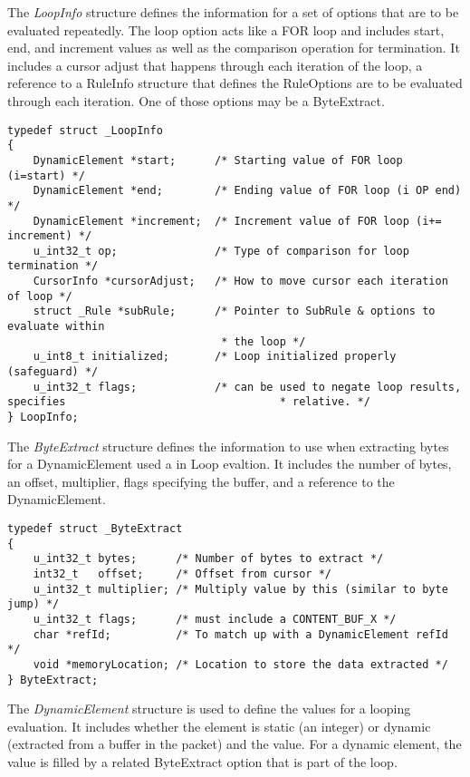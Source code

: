 \documentclass[english]{report}
\begin{document}
\begin{itemize}
The {\em LoopInfo} structure defines the information for a
set of options that are to be evaluated repeatedly.  The loop option
acts like a FOR loop and includes start, end, and increment values
as well as the comparison operation for termination.  It includes
a cursor adjust that happens through each iteration of the
loop, a reference to a RuleInfo structure that defines the
RuleOptions are to be evaluated through each iteration.  One of those
options may be a ByteExtract.

\begin{verbatim}
typedef struct _LoopInfo
{
    DynamicElement *start;      /* Starting value of FOR loop (i=start) */
    DynamicElement *end;        /* Ending value of FOR loop (i OP end) */
    DynamicElement *increment;  /* Increment value of FOR loop (i+= increment) */
    u_int32_t op;               /* Type of comparison for loop termination */
    CursorInfo *cursorAdjust;   /* How to move cursor each iteration of loop */
    struct _Rule *subRule;      /* Pointer to SubRule & options to evaluate within
                                 * the loop */
    u_int8_t initialized;       /* Loop initialized properly (safeguard) */
    u_int32_t flags;            /* can be used to negate loop results, specifies                                 * relative. */
} LoopInfo;
\end{verbatim}

The {\em ByteExtract} structure defines the information to use
when extracting bytes for a DynamicElement used a in Loop evaltion.
It includes the number of bytes, an offset, multiplier, flags
specifying the buffer, and a reference to the DynamicElement.

\begin{verbatim}
typedef struct _ByteExtract
{
    u_int32_t bytes;      /* Number of bytes to extract */
    int32_t   offset;     /* Offset from cursor */
    u_int32_t multiplier; /* Multiply value by this (similar to byte jump) */
    u_int32_t flags;      /* must include a CONTENT_BUF_X */
    char *refId;          /* To match up with a DynamicElement refId */
    void *memoryLocation; /* Location to store the data extracted */
} ByteExtract;
\end{verbatim}

The {\em DynamicElement} structure is used to define the values
for a looping evaluation.  It includes whether the element is
static (an integer) or dynamic (extracted from a buffer in the packet)
and the value.  For a dynamic element, the value is filled by
a related ByteExtract option that is part of the loop.


\end{itemize}
\end{document}
